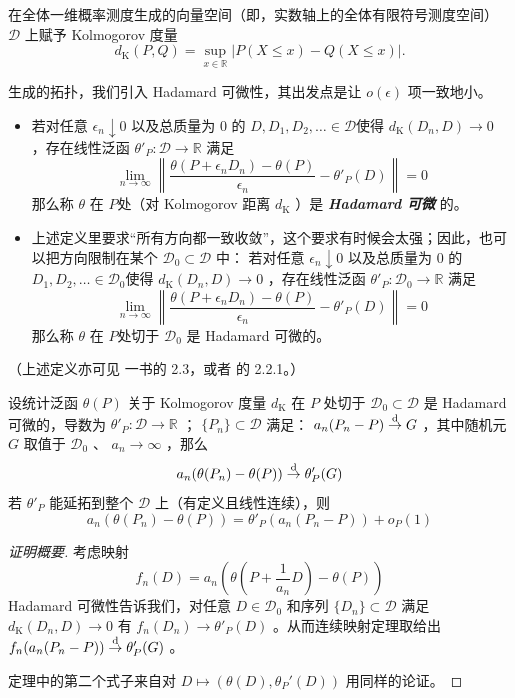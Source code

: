 在全体一维概率测度生成的向量空间（即，实数轴上的全体有限符号测度空间） $\mathscr D$ 上赋予 Kolmogorov 度量
\[
d_{\text{K}}(P,Q)=\sup_{x\in\mathbb R}|P(X\le x)-Q(X\le x)|.
\]

生成的拓扑，我们引入 Hadamard 可微性，其出发点是让 $o(\epsilon)$ 项一致地小。

\begin{definition*}

\begin{itemize}
\tightlist
\item
  若对任意 $\epsilon_n\downarrow 0$ 以及总质量为 0 的 $D,D_1,D_2,\dots\in\mathscr D$使得 $d_{\text{K}}(D_n,D)\to 0$ ，存在线性泛函 $\theta'_P:\mathscr D\to \mathbb R$ 满足\[ \lim_{n\to\infty}\left\|\frac{\theta(P+\epsilon _nD_n)-\theta(P)}{\epsilon_n}-\theta'_P(D)\right\|=0 \]那么称 $\theta$ 在 $P$处（对 Kolmogorov 距离 $d_{\text{K}}$ ）是 \textbf{\emph{Hadamard 可微}} 的。
\item
  上述定义里要求``所有方向都一致收敛''，这个要求有时候会太强；因此，也可以把方向限制在某个 $\mathscr D_0\subset \mathscr D$ 中： 若对任意 $\epsilon_n\downarrow 0$ 以及总质量为 0 的 $D_1,D_2,\dots\in\mathscr D_0$使得 $d_{\text{K}}(D_n,D)\to 0$ ，存在线性泛函 $\theta'_P:\mathscr D_0\to \mathbb R$ 满足\[ \lim_{n\to\infty}\left\|\frac{\theta(P+\epsilon _nD_n)-\theta(P)}{\epsilon_n}-\theta'_P(D)\right\|=0 \]那么称 $\theta$ 在 $P$处切于 $\mathscr D_0$ 是 Hadamard 可微的。
\end{itemize}

（上述定义亦可见 \cite{wasserman2006} 一书的 2.3，或者 \cite{shaotu1996} 的 2.2.1。）
\end{definition*}

\begin{theorem}[泛函 Delta 方法]
\label{thm:ch11:functional-delta-method}

设统计泛函 $\theta(P)$ 关于 Kolmogorov 度量 $d_{\text{K}}$ 在 $P$ 处切于 $\mathscr D_0\subset\mathscr D$ 是 Hadamard 可微的，导数为 $\theta'_P:\mathscr D\to \mathbb R$ ； $\{P_n\} \subset\mathscr D$ 满足： $a_n(P_n-P)\overset{\rm d}\to G$ ，其中随机元 $G$ 取值于 $\mathscr D_0$ 、 $a_n\to\infty$ ，那么
\[a_n(\theta(P_n)-\theta(P))\overset{\rm d}\to \theta'_P(G)\]
若 $\theta'_P$ 能延拓到整个 $\mathscr D$ 上（有定义且线性连续），则
\[a_n(\theta(P_n)-\theta(P))=\theta'_P(a_n(P_n-P))+o_P(1)\]
\end{theorem}

\begin{proof}[证明概要]
考虑映射
\[f_n(D)=a_n\left(\theta\left(P+\frac1{a_n}D\right)-\theta\left(P\right)\right)\]
Hadamard 可微性告诉我们，对任意 $D\in\mathscr D_0$ 和序列 $\{D_n\}\subset\mathscr D$ 满足 $d_{\text{K}}(D_n,D)\to 0$ 有 $f_n(D_n)\to \theta'_P(D)$ 。从而连续映射定理取给出 $f_n(a_n (P_n-P))\overset{\rm d}\to \theta_P'(G)$ 。

定理中的第二个式子来自对 $D\mapsto (\theta(D),\theta_P'(D))$ 用同样的论证。

\end{proof}

